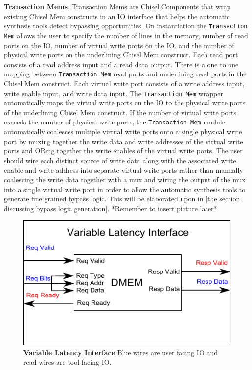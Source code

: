 {\bf Transaction Mems}. Transaction Mems are Chisel Components that
wrap existing Chisel Mem constructs in an IO interface that helps the
automatic synthesis tools detect bypassing opportunities. On
instantiation the {\tt Transaction Mem} allows the user to specify the
number of lines in the memory, number of read ports on the IO, number
of virtual write ports on the IO, and the number of physical write
ports on the underlining Chisel Mem construct. Each read port consists
of a read address input and a read data output. There is a one to one
mapping between {\tt Transaction Mem} read ports and underlining read ports
in the Chisel Mem construct. Each virtual write port consists of a
write address input, write enable input, and write data input. The
{\tt Transaction Mem} wrapper automatically maps the virtual write ports on
the IO to the physical write ports of the underlining Chisel Mem
construct. If the number of virtual write ports exceeds the number of
physical write ports, the {\tt Transaction Mem} module automatically
coalesces multiple virtual write ports onto a single physical write
port by muxing together the write data and write addresses of the
virtual write ports and ORing together the write enables of the
virtual write ports. The user should wire each distinct source of
write data along with the associated write enable and write address
into separate virtual write ports rather than manually coalescing the
write data together with a mux and wiring the output of the mux into
a single virtual write port in order to allow the automatic synthesis
tools to generate fine grained bypass logic. This will be elaborated
upon in [the section discussing bypass logic generation]. *Remember to
insert picture later*
\begin{figure}[htb]
\centering
\includegraphics{figures/VLI.pdf}
\caption{{\bf Variable Latency Interface} Blue wires are user facing IO and read wires are tool facing IO.}
\label{fig:CPI}
\end{figure}

